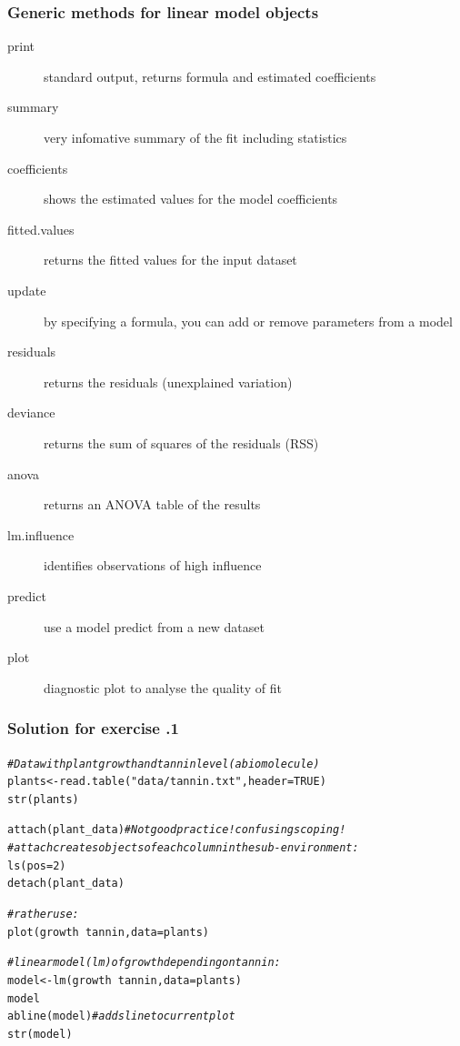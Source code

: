 \documentclass[xcolor=table, xcolor=dvipsnames]{beamer}\usepackage[]{graphicx}\usepackage[]{color}
\makeatletter
\newcommand{\hlnum}[1]{\textcolor[rgb]{0,0,0}{#1}}
\newcommand{\hlstr}[1]{\textcolor[rgb]{0.545,0.137,0.137}{#1}}
\newcommand{\hlcom}[1]{\textcolor[rgb]{0,0.392,0}{\textit{#1}}}
\newcommand{\hlopt}[1]{\textcolor[rgb]{0,0,0}{#1}}
\newcommand{\hlstd}[1]{\textcolor[rgb]{0,0,0}{#1}}
\newcommand{\hlkwb}[1]{\textcolor[rgb]{0,0,0}{#1}}
\newcommand{\hlkwc}[1]{\textcolor[rgb]{1,0,1}{#1}}
\newcommand{\hlkwd}[1]{\textcolor[rgb]{0,0,1}{#1}}
\newenvironment{kframe}{%
 \def\at@end@of@kframe{}%
 \ifinner\ifhmode%
  \def\at@end@of@kframe{\end{minipage}}%
  \begin{minipage}{\columnwidth}%
 \fi\fi%
 \def\FrameCommand##1{\hskip\@totalleftmargin \hskip-\fboxsep
 \colorbox{shadecolor}{##1}\hskip-\fboxsep
     \hskip-\linewidth \hskip-\@totalleftmargin \hskip\columnwidth}%
 \MakeFramed {\advance\hsize-\width
   \@totalleftmargin\z@ \linewidth\hsize
   \@setminipage}}%
 {\par\unskip\endMakeFramed%
 \at@end@of@kframe}
\newenvironment{knitrout}{}{} %
\newcounter{exercisecount}
\makeatother
\begin{document}
\begin{frame}[fragile]\frametitle{Generic methods for linear model objects}
\begin{description}
\item[print]{standard output, returns formula and estimated coefficients}
\item[summary]{very infomative summary of the fit including statistics}
\item[coefficients]{shows the estimated values for the model coefficients}
\item[fitted.values]{returns the fitted values for the input dataset}
\item[update]{by specifying a formula, you can add or remove parameters from a model}
\item[residuals]{returns the residuals (unexplained variation)}
\item[deviance]{returns the sum of squares of the residuals (RSS)}
\item[anova]{returns an ANOVA table of the results}
\item[lm.influence]{identifies observations of high influence}
\item[predict]{use a model predict from a new dataset}
\item[plot]{diagnostic plot to analyse the quality of fit}
\end{description}
\end{frame}


\begin{frame}[fragile]\frametitle{Solution for exercise .1}
\begin{knitrout}\small
{}\color{fgcolor}\begin{kframe}
\begin{alltt}
\hlcom{# Data with plant growth and tannin level (a biomolecule)}
\hlstd{plants} \hlkwb{<-} \hlkwd{read.table}\hlstd{(}\hlstr{"data/tannin.txt"}\hlstd{,} \hlkwc{header}\hlstd{=}\hlnum{TRUE}\hlstd{)}
\hlkwd{str}\hlstd{(plants)}

\hlkwd{attach}\hlstd{(plant_data)} \hlcom{# Not good practice! confusing scoping!}
\hlcom{# attach creates objects of each column in the sub-environment:}
\hlkwd{ls}\hlstd{(}\hlkwc{pos}\hlstd{=}\hlnum{2}\hlstd{)}
\hlkwd{detach}\hlstd{(plant_data)}

\hlcom{# rather use:}
\hlkwd{plot}\hlstd{(growth} \hlopt{~} \hlstd{tannin,} \hlkwc{data}\hlstd{=plants)}

\hlcom{# linear model (lm) of growth depending on tannin:}
\hlstd{model} \hlkwb{<-} \hlkwd{lm}\hlstd{(growth} \hlopt{~} \hlstd{tannin,} \hlkwc{data}\hlstd{=plants)}
\hlstd{model}
\hlkwd{abline}\hlstd{(model)} \hlcom{# adds line to current plot}
\hlkwd{str}\hlstd{(model)}
\end{alltt}
\end{kframe}
\end{knitrout}
\end{frame}
\end{document}
